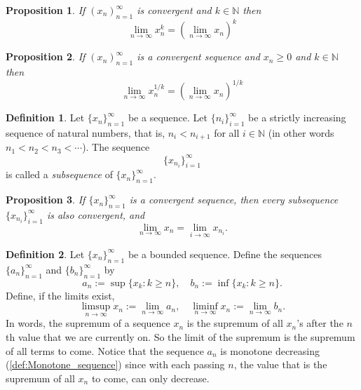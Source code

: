 \documentclass{article}
\newtheorem{proposition}{Proposition}[section]
\theoremstyle{definition}
\newtheorem{definition}{Definition}[section]
\theoremstyle{remark}
\begin{document}
\begin{proposition}\label{prop:limits raised to powers}
If $ (x_n)^\infty_{n=1}$ is convergent and $ k \in \mathbb{N}$ then
\[
\lim_{n \to \infty}{x_n^k} = \left( \lim_{n \to \infty}{x_n}\right)^k
\]
\end{proposition}




\begin{proposition}\label{prop:limits raised to roots}
If $ (x_n)^\infty_{n=1}$ is a convergent sequence and $ x_n \geq 0 $ and $ k \in \mathbb{N}$ then
\[
\lim_{n \to \infty}{x_n^{1/k}} = \left( \lim_{n \to \infty}{x_n}\right)^{1/k}
\]
\end{proposition}







\begin{definition} \label{def:subsequence}
Let \( \{x_n\}_{n=1}^{\infty} \) be a sequence. Let \( \{n_i\}_{i=1}^{\infty} \) be a strictly increasing sequence of natural numbers, that is, \( n_i < n_{i+1} \) for all \( i \in \mathbb{N} \) (in other words \( n_1 < n_2 < n_3 < \cdots \)). The sequence
\[
\{x_{n_i}\}_{i=1}^{\infty}
\]
is called a \textit{subsequence} of \( \{x_n\}_{n=1}^{\infty} \).
\end{definition}




\begin{proposition} \label{prp:subsequence limit equal to limit}
If \( \{x_n\}_{n=1}^{\infty} \) is a convergent sequence, then every subsequence \( \{x_{n_i}\}_{i=1}^{\infty} \) is also convergent, and
\[
\lim_{n \to \infty} x_n = \lim_{i \to \infty} x_{n_i}.
\]
\end{proposition}







\begin{definition} \label{def:limsup_liminf}
Let \( \{x_n\}_{n=1}^{\infty} \) be a bounded sequence. Define the sequences \( \{a_n\}_{n=1}^{\infty} \) and \( \{b_n\}_{n=1}^{\infty} \) by
\[
a_n := \sup\{ x_k : k \geq n \}, \quad b_n := \inf\{ x_k : k \geq n \}.
\]
Define, if the limits exist,
\[
\limsup_{n \to \infty} x_n := \lim_{n \to \infty} a_n, \quad \liminf_{n \to \infty} x_n := \lim_{n \to \infty} b_n.
\]
In words, the supremum of a sequence $x_n$ is the supremum of all $x_n$'s after the $n$th value that we are currently on. So the limit of the supremum is the supremum of all terms to 
come. Notice that the sequence $a_n$ is monotone decreasing (\ref{def:Monotone_sequence}) since 
with each passing $n$, the value that is the supremum of all $x_n$ to come,
can only decrease. 


\end{definition}
\end{document}
